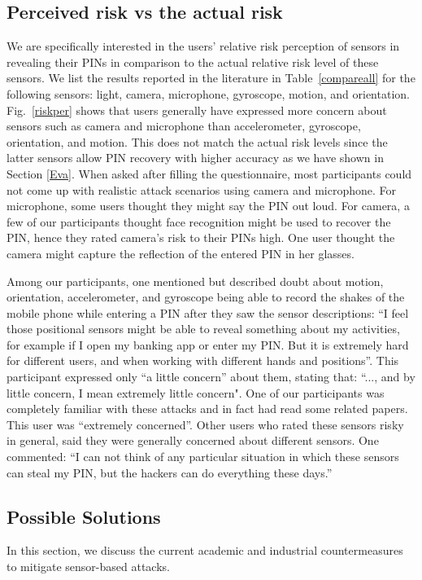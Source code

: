 \documentclass[10pt,twocolumn]{article}
\begin{document}
\subsection{Perceived risk vs the actual risk}
We are specifically interested in the users' relative risk perception of sensors in revealing their PINs in comparison to the actual relative risk level of these sensors. We list the results reported in the literature in Table~\ref{compareall} for the following sensors: light, camera, microphone, gyroscope, motion, and orientation. 
Fig.~\ref{riskper} shows that users generally have expressed more concern about sensors such as camera and microphone than accelerometer, gyroscope, orientation, and motion. This does not match the actual risk levels since the latter sensors allow PIN recovery with higher accuracy as we have shown in Section \ref{Eva}. 
When asked after filling the questionnaire, most participants could not come up with realistic attack scenarios using camera and microphone. For microphone, some users thought they might say the PIN out loud. For camera, a few of our participants thought face recognition might be used to recover the PIN, hence they rated camera's risk to their PINs high. One user thought the camera might capture the reflection of the entered PIN in her glasses. 

Among our participants, one mentioned but described doubt about motion, orientation, accelerometer, and gyroscope being able to record the shakes of the mobile phone while entering a PIN after they saw the sensor descriptions: ``I feel those positional sensors might be able to reveal something about my activities, for example if I open my banking app or enter my PIN. But it is extremely hard for different users, and when working with different hands and positions''.  
This participant expressed only ``a little concern'' about them, stating that: ``..., and by little concern, I mean extremely little concern". One of our participants was completely familiar with these attacks and in fact had read some related papers. This user was ``extremely concerned''. Other users who rated these sensors risky in general, said they were generally concerned about different sensors. One commented: ``I can not think of any particular situation in which these sensors can steal my PIN, but the hackers can do everything these days.'' 

\subsection{Possible Solutions}
\label{Sol}
In this section, we discuss the current academic and industrial countermeasures to mitigate sensor-based attacks. 
\end{document}
